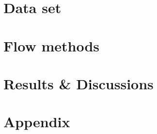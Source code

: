 \documentclass[12pt]{article}
\begin{document}
{%
\FloatBarrier
\section{Data set}

%


\FloatBarrier
\section{Flow methods}


\FloatBarrier
\section{Results \& Discussions}


\FloatBarrier
\section{Appendix}


\FloatBarrier
\newpage




}
\end{document}
